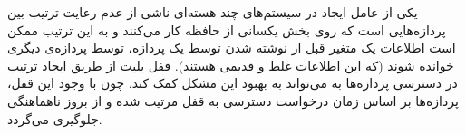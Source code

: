 یکی از عامل ایجاد
در سیستم‌های چند هسته‌ای ناشی از عدم رعایت ترتیب بین پردازه‌هایی است که روی بخش یکسانی از حافظه کار می‌کنند و به این ترتیب ممکن است اطلاعات یک متغیر قبل از نوشته شدن توسط یک پردازه، توسط پردازه‌ی دیگری خوانده شوند (که این اطلاعات غلط و قدیمی هستند). قفل بلیت از طریق ایجاد ترتیب در دسترسی پردازه‌ها به
می‌تواند به بهبود این مشکل کمک کند. چون با وجود این قفل، پردازه‌ها بر اساس زمان درخواست دسترسی به قفل مرتیب شده و از بروز ناهماهنگی جلوگیری می‌گردد.